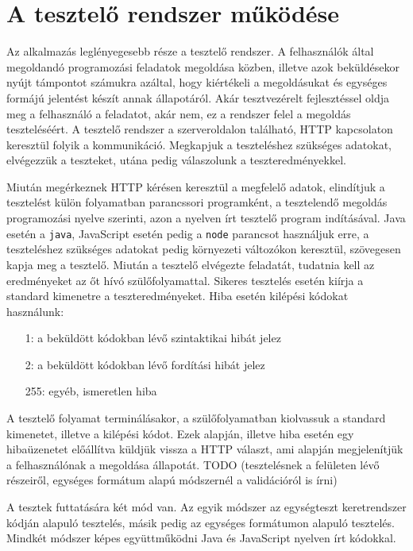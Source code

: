 \documentclass{elteikthesis}
\begin{document}
		\section{A tesztelő rendszer működése}
			Az alkalmazás leglényegesebb része a tesztelő rendszer. A felhasználók által megoldandó programozási feladatok megoldása közben, illetve azok beküldésekor nyújt támpontot számukra azáltal, hogy kiértékeli a megoldásukat és egységes formájú jelentést készít annak állapotáról. Akár tesztvezérelt fejlesztéssel oldja meg a felhasználó a feladatot, akár nem, ez a rendszer felel a megoldás teszteléséért. A tesztelő rendszer a szerveroldalon található, HTTP kapcsolaton keresztül folyik a kommunikáció. Megkapjuk a teszteléshez szükséges adatokat, elvégezzük a teszteket, utána pedig válaszolunk a teszteredményekkel.
			
			Miután megérkeznek HTTP kérésen keresztül a megfelelő adatok, elindítjuk a tesztelést külön folyamatban parancssori programként, a tesztelendő megoldás programozási nyelve szerinti, azon a nyelven írt tesztelő program indításával. Java esetén a \texttt{java}, JavaScript esetén pedig a \texttt{node} parancsot használjuk erre, a teszteléshez szükséges adatokat pedig környezeti változókon keresztül, szövegesen kapja meg a tesztelő. Miután a tesztelő elvégezte feladatát, tudatnia kell az eredményeket az őt hívó szülőfolyamattal. Sikeres tesztelés esetén kiírja a standard kimenetre a teszteredményeket. Hiba esetén kilépési kódokat használunk:
			\begin{itemize}
				\setlength\itemsep{-0.5em}
				\item[1:] a beküldött kódokban lévő szintaktikai hibát jelez
				\item[2:] a beküldött kódokban lévő fordítási hibát jelez
				\item[255:] egyéb, ismeretlen hiba
			\end{itemize}

			A tesztelő folyamat terminálásakor, a szülőfolyamatban kiolvassuk a standard kimenetet, illetve a kilépési kódot. Ezek alapján, illetve hiba esetén egy hibaüzenetet előállítva küldjük vissza a HTTP választ, ami alapján megjelenítjük a felhasználónak a megoldása állapotát. TODO (tesztelésnek a felületen lévő részeiről, egységes formátum alapú módszernél a validációról is írni)
		
			A tesztek futtatására két mód van. Az egyik módszer az egységteszt keretrendszer kódján alapuló tesztelés, másik pedig az egységes formátumon alapuló tesztelés. Mindkét módszer képes együttműködni Java és JavaScript nyelven írt kódokkal.
\end{document}

